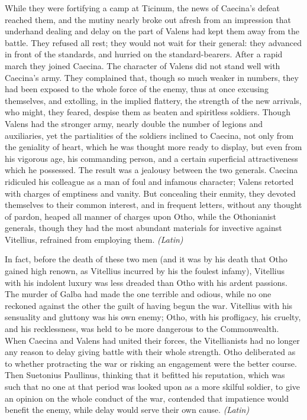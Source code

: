 
While they were fortifying a camp at Ticinum, the news of Caecina's defeat reached them, and the mutiny nearly broke out afresh from an impression that underhand dealing and delay on the part of Valens had kept them away from the battle. They refused all rest; they would not wait for their general: they advanced in front of the standards, and hurried on the standard-bearers. After a rapid march they joined Caecina. The character of Valens did not stand well with Caecina's army. They complained that, though so much weaker in numbers, they had been exposed to the whole force of the enemy, thus at once excusing themselves, and extolling, in the implied flattery, the strength of the new arrivals, who might, they feared, despise them as beaten and spiritless soldiers. Though Valens had the stronger army, nearly double the number of legions and auxiliaries, yet the partialities of the soldiers inclined to Caecina, not only from the geniality of heart, which he was thought more ready to display, but even from his vigorous age, his commanding person, and a certain superficial attractiveness which he possessed. The result was a jealousy between the two generals. Caecina ridiculed his colleague as a man of foul and infamous character; Valens retorted with charges of emptiness and vanity. But concealing their enmity, they devoted themselves to their common interest, and in frequent letters, without any thought of pardon, heaped all manner of charges upon Otho, while the Othonianist generals, though they had the most abundant materials for invective against Vitellius, refrained from employing them. \emph{(Latin)}


In fact, before the death of these two men (and it was by his death that Otho gained high renown, as Vitellius incurred by his the foulest infamy), Vitellius with his indolent luxury was less dreaded than Otho with his ardent passions. The murder of Galba had made the one terrible and odious, while no one reckoned against the other the guilt of having begun the war. Vitellius with his sensuality and gluttony was his own enemy; Otho, with his profligacy, his cruelty, and his recklessness, was held to be more dangerous to the Commonwealth. When Caecina and Valens had united their forces, the Vitellianists had no longer any reason to delay giving battle with their whole strength. Otho deliberated as to whether protracting the war or risking an engagement were the better course. Then Suetonius Paullinus, thinking that it befitted his reputation, which was such that no one at that period was looked upon as a more skilful soldier, to give an opinion on the whole conduct of the war, contended that impatience would benefit the enemy, while delay would serve their own cause. \emph{(Latin)}

